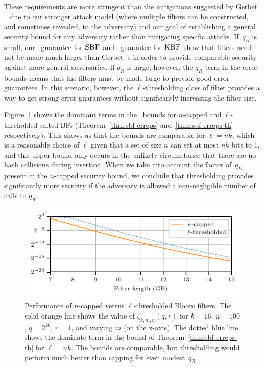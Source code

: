 These requirements are more stringent than the mitigations suggested by Gerbet
\etal~\cite{gerbet2015power} due to our stronger attack model (where multiple
filters can be constructed, and sometimes revealed, to the adversary) and our
goal of establishing a general security bound for any adversary rather than
mitigating specific attacks. If~$q_R$ is small, our \erreps\ guarantee for
$\textnormal{\textsc{SBF}}$ and \errep\ guarantee for $\textnormal{\textsc{KBF}}$ show that filters need not be made much
larger than Gerbet \etal's in order to provide comparable security against more
general adversaries. If $q_R$ is large, however, the $q_R$ term in the error
bounds means that the filters must be made large to provide good error
guarantees. In this scenario, however, the $\ell$-thresholding class of filter
provides a way to get strong error guarantees without significantly increasing
the filter size.

%
Figure~\ref{fig:bf-th} shows the dominant terms in the \erreps\ bounds for
$n$-capped and $\ell$-threholded salted BFs (Theorem~\ref{thm:sbf-erreps}
and~\ref{thm:sbf-erreps-th} respectively). This shows us that the bounds are
comparable for $\ell=nk$, which is a reasonable choice of $\ell$ given that a
set of size $n$ can set at most $nk$ bits to 1, and this upper bound only occurs
in the unlikely circumstance that there are no hash collisions during insertion.
When we take into account the factor of~$q_R$ present in the $n$-capped security
bound, we conclude that thresholding provides significantly more security if the
adversary is allowed a non-negligible number of calls to $q_R$.


\begin{figure}
  \hspace*{-10pt}
  \includegraphics{fig/bf-th}
  \vspace{-24pt}
  \caption{
    Performance of $n$-capped versus $\ell$-thresholded Bloom
    filters. The solid orange line shows the value of $\zeta_{k,m,n}(q,r)$ for
    $k=16$, $n=100$, $q=2^{16}$, $r=1$, and varying $m$ (on the x-axis).
    The dotted blue line shows the dominate term in the bound of
    Theorem~\ref{thm:sbf-erreps-th} for $\ell=nk$. The bounds are comparable,
    but thresholding would perform much better than capping for even
    modest~$q_R$.
  }
  \label{fig:bf-th}
\end{figure}
